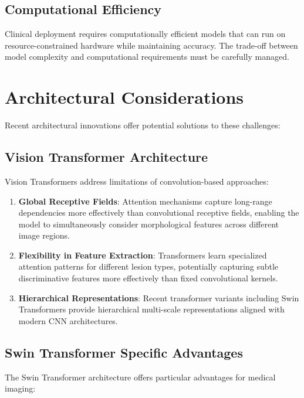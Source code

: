 \subsection{Computational Efficiency}

Clinical deployment requires computationally efficient models that can run on resource-constrained hardware while maintaining accuracy. The trade-off between model complexity and computational requirements must be carefully managed.

\section{Architectural Considerations}

Recent architectural innovations offer potential solutions to these challenges:

\subsection{Vision Transformer Architecture}

Vision Transformers address limitations of convolution-based approaches:

\begin{enumerate}
    \item \textbf{Global Receptive Fields}: Attention mechanisms capture long-range dependencies more effectively than convolutional receptive fields, enabling the model to simultaneously consider morphological features across different image regions.
    
    \item \textbf{Flexibility in Feature Extraction}: Transformers learn specialized attention patterns for different lesion types, potentially capturing subtle discriminative features more effectively than fixed convolutional kernels.
    
    \item \textbf{Hierarchical Representations}: Recent transformer variants including Swin Transformers provide hierarchical multi-scale representations aligned with modern CNN architectures.
\end{enumerate}

\subsection{Swin Transformer Specific Advantages}

The Swin Transformer architecture offers particular advantages for medical imaging:

